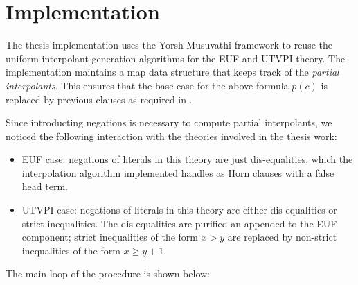 \section{Implementation}

The thesis implementation uses the Yorsh-Musuvathi framework to reuse the uniform interpolant generation algorithms for the EUF
and UTVPI theory.
The implementation maintains a map data structure that 
keeps track of the \emph{partial interpolants}. This ensures
that the base case for the above formula $p(c)$ is replaced
by previous clauses as required in \cite{10.1007/11532231_26}.

Since introducting negations is necessary to compute partial interpolants,
we noticed the following interaction with the theories involved in the
thesis work:

\begin{itemize}
  \item EUF case: negations of literals in this theory are just
    dis-equalities, which the interpolation algorithm implemented
    handles as Horn clauses with a false head term.
  \item UTVPI case: negations of literals in this theory are either
    dis-equalities or strict inequalities. The dis-equalities are purified
    an appended to the EUF component; strict inequalities of the form
    $x > y$ are replaced by non-strict inequalities of the 
    form $x \geq y + 1$.
\end{itemize}

The main loop of the procedure is shown below:

